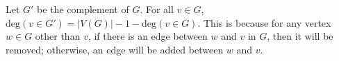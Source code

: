 Let $G'$ be the complement of $G$. For all $v \in G$, $\mbox{deg}(v \in G') = |V(G)| - 1 - \mbox{deg}(v \in G)$. This is because for any vertex $w \in G$ other than $v$, if there is an edge between $w$ and $v$ in $G$, then it will be removed; otherwise, an edge will be added between $w$ and $v$.